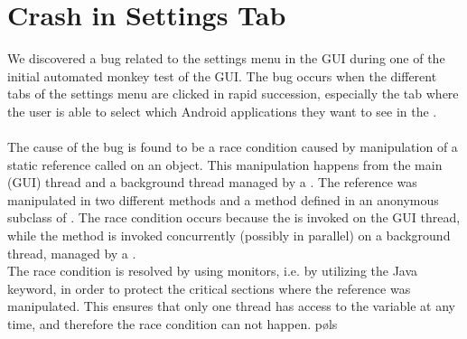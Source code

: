 \section{Crash in Settings Tab}
\label{sec:crash_in_settings_tab}

We discovered a bug related to the settings menu in the \launcher GUI during one of the initial automated monkey test of the GUI. The bug occurs when the different tabs of the settings menu are clicked in rapid succession, especially the tab where the user is able to select which Android applications they want to see in the \giraf \launcher.
\\\\
The cause of the bug is found to be a race condition caused by manipulation of a static reference called  on an  object. This manipulation happens from the main (GUI) thread and a background thread managed by a . The reference was manipulated in two different methods  and a method  defined in an anonymous subclass of . The race condition occurs because the  is invoked on the GUI thread, while the  method is invoked concurrently (possibly in parallel) on a background thread, managed by a . \\

The race condition is resolved by using monitors, i.e. by utilizing the  Java keyword, in order to protect the critical sections where the  reference was manipulated. This ensures that only one thread has access to the variable at any time, and therefore the race condition can not happen.
pøls
